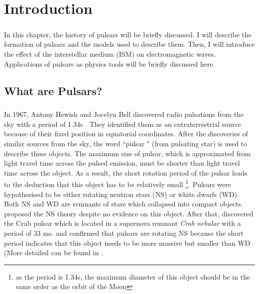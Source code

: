 \documentclass[thesis_msc.tex]{subfiles}
\begin{document}
\chapter{Introduction} \label{intro}
 
     \paragraph{} In this chapter, the history of pulsars will be briefly discussed. I will describe the formation of pulsars and the models used to describe them. Then, I will introduce the effect of the interstellar medium (ISM) on electromagnetic waves. Applications of pulsars as physics tools will be briefly discussed here. 


    \section{What are Pulsars?}
    \paragraph{} In 1967, Antony Hewish and Jocelyn Bell discovered radio pulsations from the sky with a period of 1.34s \citep{HEWISH1968}. They identified them as an extraterrestrial source because of their fixed position in equatorial coordinates.  After the discoveries of similar sources from the sky, the word ``pulsar " (from pulsating star) is used to describe these objects. The maximum size of pulsar, which is approximated from light travel time across the pulsed emission, \citep{HEWISH1968} must be shorter than light travel time across the object. As a result, the short rotation period of the pulsar leads to the deduction that this object has to be relatively small \footnote{as the period is 1.34s, the maximum diameter of this object should be in the same order as the orbit of the Moon}. Pulsars were hypothesised to be either rotating neutron stars (NS) or white dwarfs (WD). Both NS and WD are remnants of stars which collapsed into compact objects. \cite{PhysRev.46.76.2} proposed the NS theory despite no evidence on this object. After that, \cite{staelin1969passive} discovered the Crab pulsar which  is located in a supernova remnant \textit{Crab nebular}  with a period of 33 ms.  \cite{PACINI1967} and \cite{GOLD1968} confirmed that pulsars are rotating NS because the short period indicates that this object needs to be more massive but smaller than WD (More detailed can be found in \cite{GOLD1968}.   
               
\end{document}

